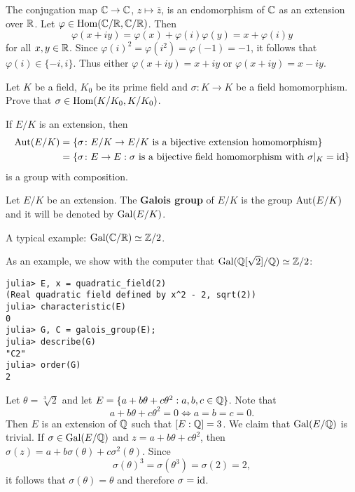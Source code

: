 \begin{example}
	The conjugation map $\mathbb{C}\to\mathbb{C}$, $z\mapsto\overline{z}$, 
	is an endomorphism of $\mathbb{C}$ as an extension over $\mathbb{R}$. Let 
	$\varphi\in\operatorname{Hom}(\mathbb{C}/\mathbb{R},\mathbb{C}/\mathbb{R})$. Then 
	\[
	\varphi(x+iy)=\varphi(x)+\varphi(i)\varphi(y)=x+\varphi(i)y
	\]
	for all $x,y\in\mathbb{R}$. Since $\varphi(i)^2=\varphi(i^2)=\varphi(-1)=-1$, 
	it follows that $\varphi(i)\in\{-i,i\}$. Thus either 
	$\varphi(x+iy)=x+iy$ or $\varphi(x+iy)=x-iy$. 
\end{example}

\begin{exercise}
	Let $K$ be a field, $K_0$ be its prime field 
        and $\sigma\colon K\to K$ be a field homomorphism. Prove that 
        $\sigma\in\operatorname{Hom}(K/K_0,K/K_0)$. 
\end{exercise}

If $E/K$ is an extension, then
\begin{align*}
	\operatorname{Aut}(E/K)&=\{\sigma\colon E/K\to E/K\text{ is a bijective extension homomorphism}\}\\
 &=\{\sigma\colon E\to E:\sigma\text{ is a bijective field homomorphism with $\sigma|_K=\operatorname{id}$}\}
\end{align*}
is a group with composition.

\begin{definition}
	Let $E/K$ be an extension. The \textbf{Galois group}
	of $E/K$ is the group
	$\operatorname{Aut}(E/K)$ and it will be denoted by $\operatorname{Gal}(E/K)$. 
\end{definition}

A typical example: $\operatorname{Gal}(\mathbb{C}/\mathbb{R})\simeq\mathbb{Z}/2$. 

As an example, we show with the computer that $\operatorname{Gal}(\mathbb{Q}[\sqrt{2}]/\mathbb{Q})\simeq\mathbb{Z}/2$:
\begin{lstlisting}
julia> E, x = quadratic_field(2)
(Real quadratic field defined by x^2 - 2, sqrt(2))
julia> characteristic(E)
0
julia> G, C = galois_group(E);
julia> describe(G)
"C2"
julia> order(G)
2
\end{lstlisting}

\begin{example}
	Let $\theta=\sqrt[3]{2}$ and let $E=\{a+b\theta+c\theta^2:a,b,c\in\mathbb{Q}\}$. Note that 
\[
	a+b\theta+c\theta^2=0 \Longleftrightarrow a=b=c=0. 
\]
Then $E$ is an extension of $\mathbb{Q}$ such that $[E:\mathbb{Q}]=3$. We claim
that $\operatorname{Gal}(E/\mathbb{Q})$ is trivial. If 
$\sigma\in\operatorname{Gal}(E/\mathbb{Q})$ and $z=a+b\theta+c\theta^2$, then
$\sigma(z)=a+b\sigma(\theta)+c\sigma^2(\theta)$. Since
\[
\sigma(\theta)^3=\sigma(\theta^3)=\sigma(2)=2,
\]
it follows
that $\sigma(\theta)=\theta$ and therefore
$\sigma=\operatorname{id}$. 
\end{example}

